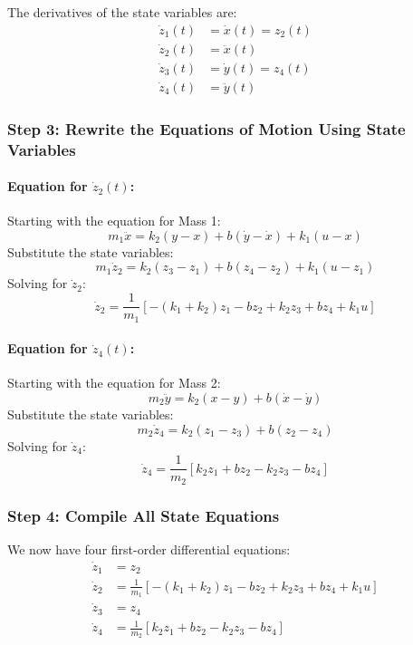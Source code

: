 \documentclass[12pt]{article}
\begin{document}
The derivatives of the state variables are:
\begin{align*}
\dot{z}_1(t) &= \dot{x}(t) = z_2(t) \\
\dot{z}_2(t) &= \ddot{x}(t) \\
\dot{z}_3(t) &= \dot{y}(t) = z_4(t) \\
\dot{z}_4(t) &= \ddot{y}(t)
\end{align*}

\subsubsection*{Step 3: Rewrite the Equations of Motion Using State Variables}

\paragraph{Equation for \( \dot{z}_2(t) \):}

Starting with the equation for Mass 1:
\[
m_1 \ddot{x} = k_2 (y - x) + b (\dot{y} - \dot{x}) + k_1 (u - x)
\]
Substitute the state variables:
\[
m_1 \dot{z}_2 = k_2 (z_3 - z_1) + b (z_4 - z_2) + k_1 (u - z_1)
\]
Solving for \( \dot{z}_2 \):
\[
\dot{z}_2 = \frac{1}{m_1} \left[ - (k_1 + k_2) z_1 - b z_2 + k_2 z_3 + b z_4 + k_1 u \right]
\]

\paragraph{Equation for \( \dot{z}_4(t) \):}

Starting with the equation for Mass 2:
\[
m_2 \ddot{y} = k_2 (x - y) + b (\dot{x} - \dot{y})
\]
Substitute the state variables:
\[
m_2 \dot{z}_4 = k_2 (z_1 - z_3) + b (z_2 - z_4)
\]
Solving for \( \dot{z}_4 \):
\[
\dot{z}_4 = \frac{1}{m_2} \left[ k_2 z_1 + b z_2 - k_2 z_3 - b z_4 \right]
\]

\subsubsection*{Step 4: Compile All State Equations}

We now have four first-order differential equations:
\begin{align*}
\dot{z}_1 &= z_2 \\
\dot{z}_2 &= \frac{1}{m_1} \left[ - (k_1 + k_2) z_1 - b z_2 + k_2 z_3 + b z_4 + k_1 u \right] \\
\dot{z}_3 &= z_4 \\
\dot{z}_4 &= \frac{1}{m_2} \left[ k_2 z_1 + b z_2 - k_2 z_3 - b z_4 \right]
\end{align*}
\end{document}
